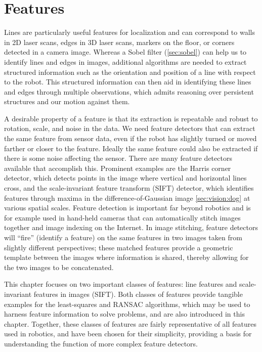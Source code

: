 \section{Features}
Lines are particularly useful features for localization and can correspond to walls in 2D laser scans, edges in 3D laser scans, markers on the floor, or corners detected in a camera image. Whereas a Sobel filter (\cref{sec:sobel}) can help us to identify lines and edges in images, additional algorithms are needed to extract structured information such as the orientation and position of a line with respect to the robot. This structured information can then aid in identifying these lines and edges through multiple observations, which admits reasoning over persistent structures and our motion against them.

A desirable property of a feature is that its extraction is repeatable and robust to rotation, scale, and noise in the data. We need feature detectors that can extract the same feature from sensor data, even if the robot has slightly turned or moved farther or closer to the feature. Ideally the same feature could also be extracted if there is some noise affecting the sensor. There are many feature detectors available that accomplish this. Prominent examples are the Harris corner detector, which detects points in the image where vertical and horizontal lines cross, and the scale-invariant feature transform (SIFT) detector, which identifies features through maxima in the difference-of-Gaussian image \cref{sec:vision:dog} at various spatial scales. Feature detection is important far beyond robotics and is for example used in hand-held cameras that can automatically stitch images together and image indexing on the Internet. In image stitching, feature detectors will ``fire'' (identify a feature) on the same features in two images taken from slightly different perspectives; these matched features provide a geometric template between the images where information is shared, thereby allowing for the two images to be concatenated.

This chapter focuses on two important classes of features: line features and scale-invariant features in images (SIFT). Both classes of features provide tangible examples for the least-squares and RANSAC algorithms, which may be used to harness feature information to solve problems, and are also introduced in this chapter. Together, these classes of features are fairly representative of all features used in robotics, and have been chosen for their simplicity, providing a basis for understanding the function of more complex feature detectors.

